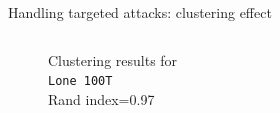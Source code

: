 \begin{frame}{Handling targeted attacks: clustering effect}
  \begin{columns}
    \begin{column}{.4\textwidth}
    
      \vspace{-0.5cm}
      \begin{figure}
      
        \captionsetup{justification=centering}
        \caption*{Clustering results for\\
        \texttt{Lone 100T}\\ 
        Rand index=0.97}
      \end{figure}


\end{column}
\end{columns}
\end{frame}
